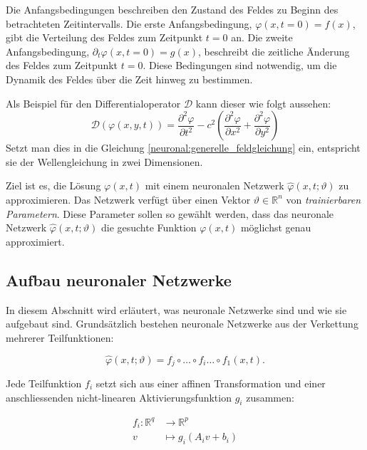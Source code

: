 Die Anfangsbedingungen beschreiben den Zustand des Feldes zu Beginn des betrachteten Zeitintervalls.
Die erste Anfangsbedingung, $\varphi(x, t = 0) = f(x)$, gibt die Verteilung des Feldes zum Zeitpunkt $t = 0$ an.
Die zweite Anfangsbedingung, $\partial_t \varphi(x, t = 0) = g(x)$, beschreibt die zeitliche Änderung des Feldes zum Zeitpunkt $t = 0$.
Diese Bedingungen sind notwendig, um die Dynamik des Feldes über die Zeit hinweg zu bestimmen.

Als Beispiel für den Differentialoperator $\mathcal{D}$ kann dieser wie folgt aussehen:
\begin{equation*}
    \mathcal{D}(\varphi(x, y, t)) = \frac{\partial^2 \varphi}{\partial t^2} - c^2 \left( \frac{\partial^2 \varphi}{\partial x^2} + \frac{\partial^2 \varphi}{\partial y^2} \right)
\end{equation*}
Setzt man dies in die Gleichung \eqref{neuronal:generelle_feldgleichung} ein, entspricht sie der Wellengleichung in zwei Dimensionen.

Ziel ist es, die Lösung $\varphi(x, t)$ mit einem neuronalen Netzwerk $\hat{\varphi}(x, t; \vartheta)$ zu approximieren.
Das Netzwerk verfügt über einen Vektor \( \vartheta \in \mathbb{R}^n \) von \emph{trainierbaren Parametern}.
Diese Parameter sollen so gewählt werden, dass das neuronale Netzwerk $\hat{\varphi}(x, t; \vartheta)$ die gesuchte Funktion $\varphi(x, t)$ möglichst genau approximiert.

\subsection{Aufbau neuronaler Netzwerke}\label{neuronal:subsection:struktur_nn}
In diesem Abschnitt wird erläutert, was neuronale Netzwerke sind und wie sie aufgebaut sind.
Grundsätzlich bestehen neuronale Netzwerke aus der Verkettung mehrerer Teilfunktionen:

\begin{equation}
    \hat{\varphi}(x, t; \vartheta) = f_j \circ \ldots \circ f_i \ldots \circ f_1(x, t).
    \label{neuronal:nn_ausformuliert}
\end{equation}

Jede Teilfunktion \( f_i \) setzt sich aus einer affinen Transformation und einer anschliessenden nicht-linearen Aktivierungsfunktion \( g_i \) zusammen:

\begin{align*}
    f_i\colon \mathbb{R}^q & \longrightarrow \mathbb{R}^p \\
    v & \longmapsto g_i(A_i v + b_i)
\end{align*}

